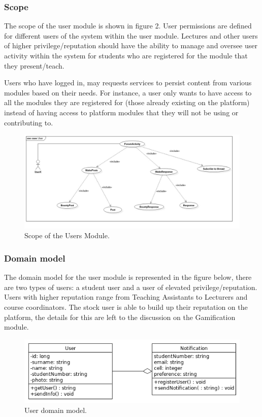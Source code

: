 \documentclass[12pt]{article}
\begin{document}
\subsubsection{Scope}
\par{The scope of the user module is shown in figure 2. User permissions are defined for different users of the system within the user module. Lectures and other users of higher privilege/reputation should have the ability to manage and oversee user activity within the system for students who are registered for the module that they present/teach.}
\medskip
\par{Users who have logged in, may requests services to persist content from various modules based on their needs. For instance, a user only wants to have access to all the modules they are registered for (those  already existing on the platform) instead of having access to platform modules that they will not be using or contributing to.}

\begin{figure}[h!]
\includegraphics[width=\linewidth]{Diagrams/ForumActivityUC.jpg}
\caption{Scope of the Users Module.}
\end{figure}

\subsubsection{Domain model}
\par{The domain model for the user module is represented in the figure below, there are two types of users: a student user and a user of elevated privilege/reputation. Users with higher reputation range from Teaching Assistants to Lecturers and course coordinators. The stock user is able to build up their reputation on the platform, the details for this are left to the discussion on the Gamification module.}

\begin{figure}[h!]
\includegraphics[width=\linewidth]{Diagrams/userDomain.png}
\caption{User domain model.}
\end{figure}
\end{document}
